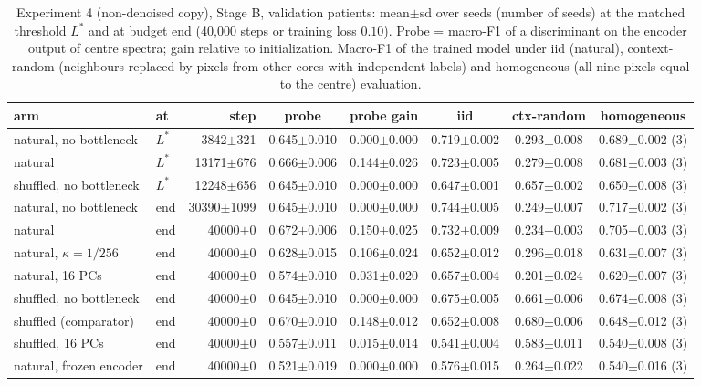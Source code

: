 \begin{table}[htbp]\centering\scriptsize
\caption{Experiment 4 (non-denoised copy), Stage B, validation patients: mean$\pm$sd over seeds (number of seeds) at the matched threshold $L^\ast$ and at budget end (40{,}000 steps or training loss $0.10$). Probe = macro-F1 of a discriminant on the encoder output of centre spectra; gain relative to initialization. Macro-F1 of the trained model under iid (natural), context-random (neighbours replaced by pixels from other cores with independent labels) and homogeneous (all nine pixels equal to the centre) evaluation.}\label{tab:exp4_val_nodenoise}
\begin{tabular}{llrccccc}\toprule
arm & at & step & probe & probe gain & iid & ctx-random & homogeneous \\ \midrule
natural, no bottleneck & $L^\ast$ & 3842$\pm$321 & 0.645$\pm$0.010 & 0.000$\pm$0.000 & 0.719$\pm$0.002 & 0.293$\pm$0.008 & 0.689$\pm$0.002 (3) \\
natural & $L^\ast$ & 13171$\pm$676 & 0.666$\pm$0.006 & 0.144$\pm$0.026 & 0.723$\pm$0.005 & 0.279$\pm$0.008 & 0.681$\pm$0.003 (3) \\
shuffled, no bottleneck & $L^\ast$ & 12248$\pm$656 & 0.645$\pm$0.010 & 0.000$\pm$0.000 & 0.647$\pm$0.001 & 0.657$\pm$0.002 & 0.650$\pm$0.008 (3) \\
\midrule
natural, no bottleneck & end & 30390$\pm$1099 & 0.645$\pm$0.010 & 0.000$\pm$0.000 & 0.744$\pm$0.005 & 0.249$\pm$0.007 & 0.717$\pm$0.002 (3) \\
natural & end & 40000$\pm$0 & 0.672$\pm$0.006 & 0.150$\pm$0.025 & 0.732$\pm$0.009 & 0.234$\pm$0.003 & 0.705$\pm$0.003 (3) \\
natural, $\kappa=1/256$ & end & 40000$\pm$0 & 0.628$\pm$0.015 & 0.106$\pm$0.024 & 0.652$\pm$0.012 & 0.296$\pm$0.018 & 0.631$\pm$0.007 (3) \\
natural, 16 PCs & end & 40000$\pm$0 & 0.574$\pm$0.010 & 0.031$\pm$0.020 & 0.657$\pm$0.004 & 0.201$\pm$0.024 & 0.620$\pm$0.007 (3) \\
shuffled, no bottleneck & end & 40000$\pm$0 & 0.645$\pm$0.010 & 0.000$\pm$0.000 & 0.675$\pm$0.005 & 0.661$\pm$0.006 & 0.674$\pm$0.008 (3) \\
shuffled (comparator) & end & 40000$\pm$0 & 0.670$\pm$0.010 & 0.148$\pm$0.012 & 0.652$\pm$0.008 & 0.680$\pm$0.006 & 0.648$\pm$0.012 (3) \\
shuffled, 16 PCs & end & 40000$\pm$0 & 0.557$\pm$0.011 & 0.015$\pm$0.014 & 0.541$\pm$0.004 & 0.583$\pm$0.011 & 0.540$\pm$0.008 (3) \\
natural, frozen encoder & end & 40000$\pm$0 & 0.521$\pm$0.019 & 0.000$\pm$0.000 & 0.576$\pm$0.015 & 0.264$\pm$0.022 & 0.540$\pm$0.016 (3) \\
\bottomrule
\end{tabular}\end{table}
